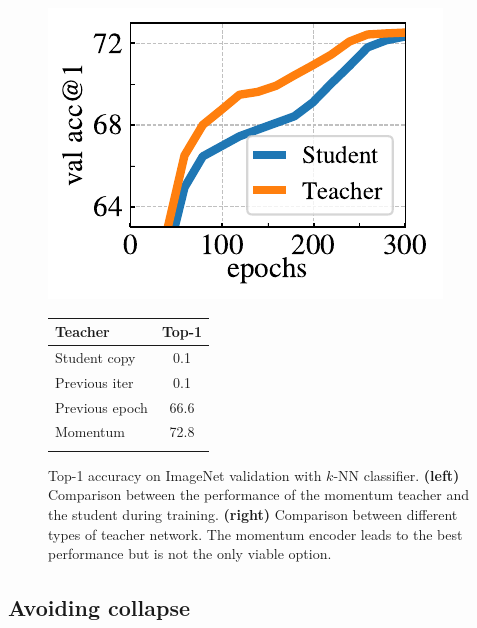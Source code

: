 \begin{figure}[t]
  \begin{minipage}{0.55\linewidth}
	\centering
    \includegraphics[width=\linewidth]{figure_mom.pdf}
  \end{minipage}
\hspace{.5em}
  \begin{minipage}[t]{0.4\linewidth}
    \centering
\small
  \begin{tabular}{@{}l c@{}}
    \toprule
    Teacher & Top-1 \\
    \midrule
    Student copy & 0.1 \\
    Previous iter & 0.1\\
    Previous epoch & 66.6 \\
    Momentum & 72.8 \\
  \bottomrule
\phantom{latex!}
  \end{tabular}
  \end{minipage}
	\caption{
Top-1 accuracy on ImageNet validation with $k$-NN classifier.
\textbf{(left)} Comparison between the performance of the momentum teacher and the student during training.
\textbf{(right)} Comparison between different types of teacher network.
The momentum encoder leads to the best performance but is not the only viable option.
	}
	\label{fig:mom}
\end{figure}


\subsection{Avoiding collapse}
\label{sec:collapse}

